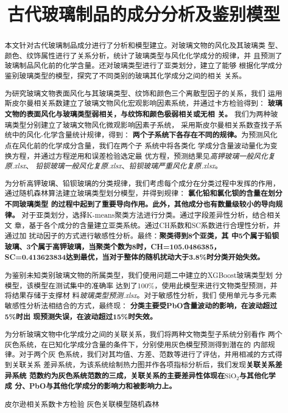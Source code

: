 \documentclass[withoutpreface,bwprint]{cumcmthesis} %
\title{古代玻璃制品的成分分析及鉴别模型}
\begin{document}
\maketitle
\begin{abstract}
本文针对古代玻璃制品成分进行了分析和模型建立。对玻璃文物的风化及其玻璃类
型、颜色、纹饰属性进行了关系分析，统计了玻璃类型与风化化学成分的规律，并
且预测了玻璃制品风化前的化学含量。还对玻璃类型进行了亚类划分，建立了能够
根据化学成分鉴别玻璃类型的模型，探究了不同类别的玻璃其化学成分之间的相关
关系。

为研究玻璃文物表面风化与其玻璃类型、纹饰和颜色三个离散型因子的关系，我们
运用斯皮尔曼相关系数建立了玻璃文物风化宏观影响因素系统，并通过卡方检验得到：
\textbf{玻璃文物的表面风化与玻璃类型弱相关，与纹饰和颜色极弱相关或无相
关。}
我们为两种玻璃类型分别建立了玻璃文物风化微观影响因素子系统，
采用斯皮尔曼相关系数查找子系统中的风化-化学含量统计规律，得到：
\textbf{两个子系统下各存在不同的规律。}为预测风化点在风化前的化学成分含量，我们在两个子
系统中将各类化
学成分含量波动量化为变换方程，并通过方程逆用和误差检验选定最
优方程，预测结果见\emph{高钾玻璃一般风化复原.xlsx}、
\emph{铅钡玻璃一般风化复原.xlsx}、\emph{铅钡玻璃严重风化复原.xlsx}。

为分析高钾玻璃、铅钡玻璃的分类规律，我们考虑每个成分在分类过程中发挥的作用，
通过随机森林算法建立玻璃类型划分模型，并得到规律：
\textbf{氯化铅和氯化钡的含量在划分不同玻璃类型
的过程中起到了重要导向作用。此外，其他成分也有数量级较小的导向规律。}
对于亚类划分，选择K-means聚类方法进行分类。通过字段差异性分析，结合相关文
章，基于各个成分的含量建立亚类系统。通过CH系数和SC系数进行合理性分析，并通过加
扰动因子的方式进行敏感性分析。最终：\textbf{聚类得到8个亚类，其
中5个属于铅钡玻璃、3个属于高钾玻璃，当聚类个数为8时，CH=105.0486385，
SC=0.413623834达到最优，当对于整体的随机扰动大于3.8\%时分类开始失效。}

为鉴别未知类别玻璃文物的所属类型，我们使用问题二中建立的XGBoost玻璃类型划
分模型，该模型在测试集中的准确率
达到了100\%，使用此模型来进行文物类型预测，并将结果存储于支撑材
料\emph{玻璃类型预测.xlsx}。对于敏感性分析，我们
使用单元与多元素敏感性分析法相结合的方式，最终现：
\textbf{分类主要受PbO含量波动的影响，在波动超过5\%时出
现预测失误，在波动超过15\%时失效。}

为分析玻璃文物中化学成分之间的关联关系，我们将两种文物类型子系统分别看作
两个灰色系统，在已知化学成分含量的条件下，分别使用灰色模型预测得到潜在的
内部规律。对于两个灰
色系统，我们对其均值、方差、范数等进行了评估，并用相减的方式得到关联关系
差异系统，为该系统绘制热力图并作各项指标分析后，我们发现\textbf{关联关系差异系统
范数约为灰色系统范数的三成，关联关系的主要差异性体现在$\mathrm{SiO_2}$与其他化学成
分、PbO与其他化学成分的影响力和被影响力上。}

\quad 皮尔逊相关系数\quad 卡方检验 \quad
灰色关联模型\quad 随机森林
\end{abstract}
\end{document}
